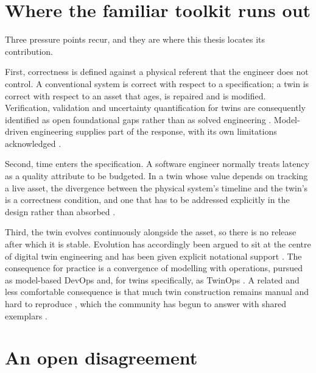 \section{Where the familiar toolkit runs out}
\label{sec:dt-intro:limits}

Three pressure points recur, and they are where this thesis locates its
contribution.

First, correctness is defined against a physical referent that the engineer
does not control. A conventional system is correct with respect to a
specification; a twin is correct with respect to an asset that ages, is
repaired and is modified. Verification, validation and uncertainty
quantification for twins are consequently identified as open foundational
gaps rather than as solved engineering
\citep{committee_on_foundational_research_gaps_and_future_directions_for_digital_twins_foundational_2024}.
Model-driven engineering supplies part of the response, with its own
limitations acknowledged \citep{michael_model-driven_2025}.

Second, time enters the specification. A software engineer normally treats
latency as a quality attribute to be budgeted. In a twin whose value depends
on tracking a live asset, the divergence between the physical system's
timeline and the twin's is a correctness condition, and one that has to be
addressed explicitly in the design rather than absorbed
\citep{frasheri_addressing_2023}.

Third, the twin evolves continuously alongside the asset, so there is no
release after which it is stable. Evolution has accordingly been argued to sit
at the centre of digital twin engineering \citep{alskaif_evolution_2025} and
has been given explicit notational support \citep{mertens_continuous_2024}.
The consequence for practice is a convergence of modelling with operations,
pursued as model-based DevOps \citep{combemale_model-based_2023} and, for
twins specifically, as TwinOps \citep{hugues_twinops_2022}. A related and less
comfortable consequence is that much twin construction remains manual and
hard to reproduce \citep{barbie_toward_2024}, which the community has begun to
answer with shared exemplars \citep{kamburjan_greenhousedt_2024}.

\section{An open disagreement}
\label{sec:dt-intro:disagreement}

